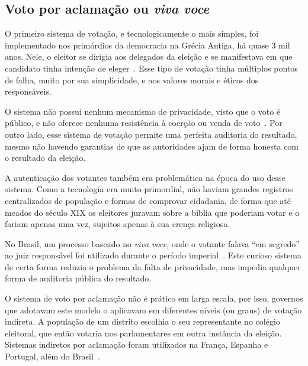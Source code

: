 \subsection{Voto por aclamação ou \textit{viva voce}}

O primeiro sistema de votação, e tecnologicamente o mais simples, foi implementado nos primórdios da democracia na Grécia Antiga, há quase 3 mil anos. Nele, o eleitor se dirigia aos delegados da eleição e se manifestava em que candidato tinha intenção de eleger~\cite{wolfson1899ballot}. Esse tipo de votação tinha múltiplos pontos de falha, muito por sua simplicidade, e aos valores morais e éticos dos responsáveis.

O sistema não possui nenhum mecanismo de privacidade, visto que o voto é público, e não oferece nenhuma resistência à coerção ou venda de voto~\cite{buchstein2010public}. Por outro lado, esse sistema de votação permite uma perfeita auditoria do resultado, mesmo não havendo garantias de que as autoridades ajam de forma honesta com o resultado da eleição.

A autenticação dos votantes também era problemática na época do uso desse sistema. Como a tecnologia era muito primordial, não haviam grandes registros centralizados de população e formas de comprovar cidadania, de forma que até meados do século XIX os eleitores juravam sobre a bíblia que poderiam votar e o fariam apenas uma vez, sujeitos apenas à sua crença religiosa.

No Brasil, um processo baseado no \textit{viva voce}, onde o votante falava ``em segredo'' ao juiz responsável foi utilizado durante o período imperial~\cite{nicolau2012eleicoes}. Este curioso sistema de certa forma reduzia o problema da falta de privacidade, mas impedia qualquer forma de auditoria pública do resultado.

O sistema de voto por aclamação não é prático em larga escala, por isso, governos que adotavam este modelo o aplicavam em diferentes níveis (ou graus) de votação indireta. A população de um distrito escolhia o seu representante no colégio eleitoral, que então votaria nos parlamentares em outra instância da eleição. Sistemas indiretos por aclamação foram utilizados na França, Espanha e Portugal, além do Brasil~\cite{nicolau2012eleicoes}.